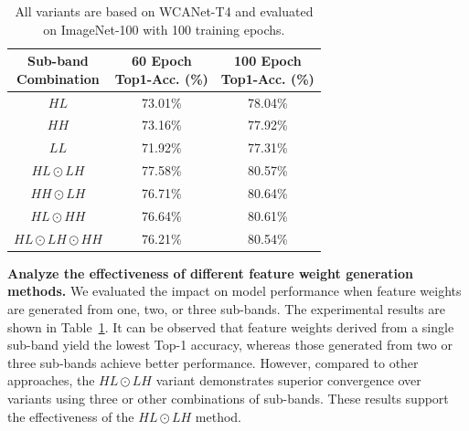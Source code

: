 \documentclass[a4paper,fleqn]{cas-dc}
\begin{document}
\begin{table} [pos=h]
    \centering
    \caption{All variants are based on WCANet-T4 and evaluated on ImageNet-100 with 100 training epochs.}
    \begin{tabular}{c|c|c}
    \toprule
    \makecell{Sub-band\\Combination} &  \makecell{60 Epoch \\ Top1-Acc. (\%)} & \makecell{100 Epoch \\ Top1-Acc. (\%)}  \\
     \midrule
        $HL$ & 73.01\% & 78.04\% \\
        $HH$ & 73.16\% & 77.92\% \\
        $LL$ & 71.92\% & 77.31\% \\ \midrule
        $HL \odot LH$ &  77.58\% & 80.57\% \\
        $HH \odot LH$ &  76.71\% & 80.64\% \\
        $HL \odot HH$ &  76.64\% & 80.61\% \\ \midrule
        $HL \odot LH \odot HH$ & 76.21\% & 80.54\%  \\
    \bottomrule
    \end{tabular}
    \label{tab:placeholder}
\end{table}



\textbf{Analyze the effectiveness of different feature weight generation methods.} We evaluated the impact on model performance when feature weights are generated from one, two, or three {\color{blue}sub-bands}. 
The experimental results are shown in Table~\ref{tab:placeholder}. It can be observed that feature weights derived from a single sub-band yield the lowest Top-1 accuracy, whereas those generated from two or three {\color{blue}sub-bands} achieve better performance.
However, compared to other approaches, the $HL \odot LH$ variant demonstrates superior convergence over variants using three or other combinations of {\color{blue}sub-bands}. These results support the effectiveness of the $HL \odot LH$ method.

\end{document}
